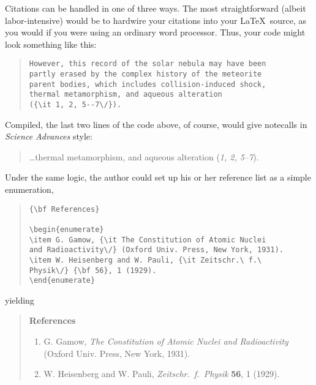 \documentclass[12pt]{article}
\begin{document}
Citations can be handled in one of three ways.  The most
straightforward (albeit labor-intensive) would be to hardwire your
citations into your \LaTeX\ source, as you would if you were using an
ordinary word processor.  Thus, your code might look something like
this:


\begin{quote}
\begin{verbatim}
However, this record of the solar nebula may have been
partly erased by the complex history of the meteorite
parent bodies, which includes collision-induced shock,
thermal metamorphism, and aqueous alteration
({\it 1, 2, 5--7\/}).
\end{verbatim}
\end{quote}


\noindent Compiled, the last two lines of the code above, of course, would give notecalls in {\it Science Advances\/} style:

\begin{quote}
\ldots thermal metamorphism, and aqueous alteration ({\it 1, 2, 5--7\/}).
\end{quote}

Under the same logic, the author could set up his or her reference list as a simple enumeration,

\begin{quote}
\begin{verbatim}
{\bf References}

\begin{enumerate}
\item G. Gamow, {\it The Constitution of Atomic Nuclei
and Radioactivity\/} (Oxford Univ. Press, New York, 1931).
\item W. Heisenberg and W. Pauli, {\it Zeitschr.\ f.\ 
Physik\/} {\bf 56}, 1 (1929).
\end{enumerate}
\end{verbatim}
\end{quote}

\noindent yielding

\begin{quote}
{\bf References}

\begin{enumerate}
\item G. Gamow, {\it The Constitution of Atomic Nuclei and
Radioactivity\/} (Oxford Univ. Press, New York, 1931).
\item W. Heisenberg and W. Pauli, {\it Zeitschr.\ f.\ Physik} {\bf 56},
1 (1929).
\end{enumerate}
\end{quote}
\end{document}

